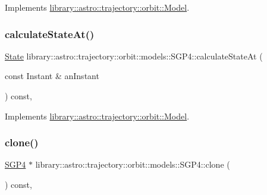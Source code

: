 Implements \hyperlink{classlibrary_1_1astro_1_1trajectory_1_1orbit_1_1_model_a6329db5556ed72aa8ad18515aeaefeab}{library\+::astro\+::trajectory\+::orbit\+::\+Model}.

\mbox{\label{classlibrary_1_1astro_1_1trajectory_1_1orbit_1_1models_1_1_s_g_p4_a5d94d349c464f7313017c795a9346084}} 
\subsubsection{\texorpdfstring{calculate\+State\+At()}{calculateStateAt()}}
{\footnotesize\ttfamily \hyperlink{classlibrary_1_1astro_1_1trajectory_1_1_state}{State} library\+::astro\+::trajectory\+::orbit\+::models\+::\+S\+G\+P4\+::calculate\+State\+At (\begin{DoxyParamCaption}\item[{const Instant \&}]{an\+Instant }\end{DoxyParamCaption}) const\hspace{0.3cm}{\ttfamily [override]}, {\ttfamily [virtual]}}



Implements \hyperlink{classlibrary_1_1astro_1_1trajectory_1_1orbit_1_1_model_a34198a504836b9779425da99d964d19c}{library\+::astro\+::trajectory\+::orbit\+::\+Model}.

\mbox{\label{classlibrary_1_1astro_1_1trajectory_1_1orbit_1_1models_1_1_s_g_p4_afa3add6c6855ac1da5632b17986dca02}} 
\subsubsection{\texorpdfstring{clone()}{clone()}}
{\footnotesize\ttfamily \hyperlink{classlibrary_1_1astro_1_1trajectory_1_1orbit_1_1models_1_1_s_g_p4}{S\+G\+P4} $\ast$ library\+::astro\+::trajectory\+::orbit\+::models\+::\+S\+G\+P4\+::clone (\begin{DoxyParamCaption}{ }\end{DoxyParamCaption}) const\hspace{0.3cm}{\ttfamily [override]}, {\ttfamily [virtual]}}



